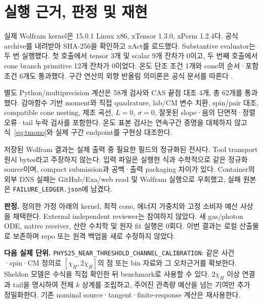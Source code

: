 \documentclass[11pt,a4paper]{article}
\begin{document}
\newpage
\section{실행 근거, 판정 및 재현}
실제 Wolfram kernel은 15.0.1 Linux x86, xTensor 1.3.0, xPerm 1.2.4다. 공식 archive를 내려받아 SHA-256을 확인하고 xAct를 로드했다. Substantive evaluator는 두 번 실행했다. 첫 호출에서 tensor 3개 및 scalar 9개 잔차가 0이고, 두 번째 호출에서 cone branch primitive 12개 잔차가 0이었다. 온도 단조 조건 1개와 cone의 순서·포함 조건 6개도 통과했다. 구간 연산의 외향 반올림 의미론은 공식 문서를 따른다 \cite{wl}.

별도 Python/multiprecision 계산은 58개 검사와 CAS 끝점 대조 4개, 총 62개를 통과했다. 감마함수 기반 moment와 직접 quadrature, lab/CM 변수 치환, spin/pair 대조, compatible cone nesting, 제조 곡선, $L=0$, $\sigma=0$, 잘못된 slope·음의 단면적·정렬 오류·tail 누락 검사를 포함한다. 온도 표본 검사는 연속구간 증명을 대체하지 않고 식~\eqref{eq:tmono}와 실제 구간 endpoint를 구현상 대조한다.

저장된 Wolfram 결과는 실제 출력 중 필요한 필드의 정규화된 전사다. Tool transport 원시 bytes라고 주장하지 않는다. 입력 파일은 실행한 식과 수학적으로 같은 정규화 source이며, compact submission과 공백·출력 packaging 차이가 있다. Container의 외부 DNS 실패는 GitHub/Exa/web read 및 Wolfram 실행으로 우회했고, 실패 원본은 \texttt{FAILURE\_LEDGER.json}에 남겼다.

\textbf{판정.} 정의한 가정 아래의 kernel, 최적 cone, 에너지 가중치와 고정 소비자 예산 사상을 채택한다. External independent reviewer는 참여하지 않았다. 새 gas/photon ODE, native receiver, 산란 수치학 및 원자 fit 실행은 0회다. 이번 결과는 로컬 산출물로 보존하며 repo 또는 원격 백업을 새로 수정하지 않았다.

\textbf{다음 실제 단위.} \texttt{PHYS25\_NEAR\_THRESHOLD\_CHANNEL\_CALIBRATION}: 같은 사건·spin·CM 정의로 $[\chi_H,2\chi_H]$의 점 또는 bin 자료와 그 오차근거를 확보한다. Sheldon 모델은 수식을 직접 확인한 뒤 benchmark로 사용할 수 있다. $2\chi_H$ 이상 연결과 tail을 명시하여 전체 $k$ 상계를 조립하고, 주어진 관측량 예산을 넘는 기여만 추가 정밀화한다. 기존 nominal source·tangent·finite-response 계산은 재사용한다.
\end{document}
